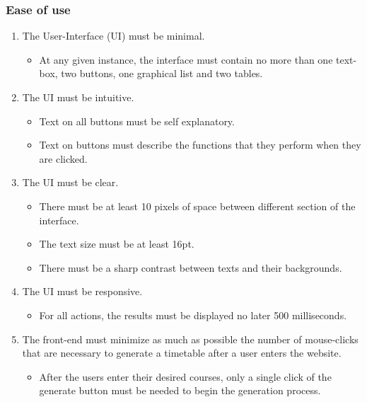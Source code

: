 \documentclass[12pt]{article}
\begin{document}
\subsubsection{Ease of use}
\begin{enumerate}
    \item The User-Interface (UI) must be minimal.
    \begin{itemize}
        \item At any given instance, the interface must contain no more than one text-box, two buttons, one graphical list and two tables.
    \end{itemize}
    \item The UI must be intuitive.
    \begin{itemize}
        \item Text on all buttons must be self explanatory.
        \item Text on buttons must describe the functions that they perform when they are clicked.
    \end{itemize}
    \item The UI must be clear.
    \begin{itemize}
        \item There must be at least 10 pixels of space between different section of the interface.
        \item The text size must be at least 16pt.
        \item There must be a sharp contrast between texts and their backgrounds.
    \end{itemize}
    \item The UI must be responsive.
    \begin{itemize}
        \item For all actions, the results must be displayed no later 500 milliseconds.
    \end{itemize}
    \item The front-end must minimize as much as possible the number of mouse-clicks that are necessary to generate a timetable after a user enters the website.
    \begin{itemize}
        \item After the users enter their desired courses, only a single click of the generate button must be needed to begin the generation process.
    \end{itemize}
\end{enumerate}
\end{document}
